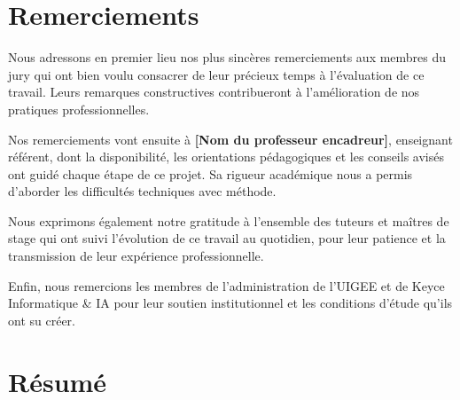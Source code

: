 \documentclass[12pt, a4paper, oneside]{report}
\begin{document}
\setcounter{page}{1}

{
  \setcounter{tocdepth}{1}
  \renewcommand{\contentsname}{Sommaire}
  \tableofcontents
}
\setcounter{tocdepth}{3}

\chapter*{Remerciements}

Nous adressons en premier lieu nos plus sincères remerciements aux membres du jury qui ont
bien voulu consacrer de leur précieux temps à l'évaluation de ce travail. Leurs remarques
constructives contribueront à l'amélioration de nos pratiques professionnelles.

Nos remerciements vont ensuite à \textbf{[Nom du professeur encadreur]}, enseignant
référent, dont la disponibilité, les orientations pédagogiques et les conseils avisés ont
guidé chaque étape de ce projet. Sa rigueur académique nous a permis d'aborder les
difficultés techniques avec méthode.

Nous exprimons également notre gratitude à l'ensemble des tuteurs et maîtres de stage qui
ont suivi l'évolution de ce travail au quotidien, pour leur patience et la transmission
de leur expérience professionnelle.

Enfin, nous remercions les membres de l'administration de l'UIGEE et de Keyce Informatique
\& IA pour leur soutien institutionnel et les conditions d'étude qu'ils ont su créer.

\chapter*{Résumé}
\end{document}
